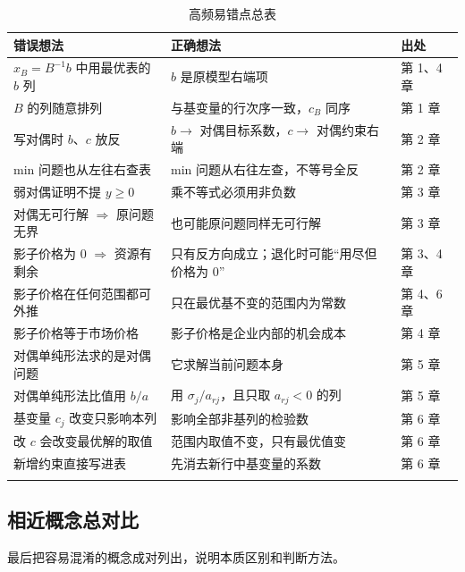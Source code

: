 {\small
\begin{xltabular}{\linewidth}{@{}>{\raggedright\arraybackslash}p{4.2cm}>{\raggedright\arraybackslash}X>{\raggedright\arraybackslash}p{1.6cm}@{}}
\toprule
{}错误想法 & 正确想法 & 出处\\\midrule\endhead
$x_B=B^{-1}b$ 中用最优表的 $b$ 列 & $b$ 是原模型右端项 & 第 1、4 章\\
$B$ 的列随意排列 & 与基变量的行次序一致，$c_B$ 同序 & 第 1 章\\
写对偶时 $b$、$c$ 放反 & $b\to$ 对偶目标系数，$c\to$ 对偶约束右端 & 第 2 章\\
min 问题也从左往右查表 & min 问题从右往左查，不等号全反 & 第 2 章\\
弱对偶证明不提 $y\ge0$ & 乘不等式必须用非负数 & 第 3 章\\
对偶无可行解 $\Rightarrow$ 原问题无界 & 也可能原问题同样无可行解 & 第 3 章\\
影子价格为 0 $\Rightarrow$ 资源有剩余 & 只有反方向成立；退化时可能“用尽但价格为 0” & 第 3、4 章\\
影子价格在任何范围都可外推 & 只在最优基不变的范围内为常数 & 第 4、6 章\\
影子价格等于市场价格 & 影子价格是企业内部的机会成本 & 第 4 章\\
对偶单纯形法求的是对偶问题 & 它求解当前问题本身 & 第 5 章\\
对偶单纯形法比值用 $b/a$ & 用 $\sigma_j/a_{rj}$，且只取 $a_{rj}<0$ 的列 & 第 5 章\\
基变量 $c_j$ 改变只影响本列 & 影响全部非基列的检验数 & 第 6 章\\
改 $c$ 会改变最优解的取值 & 范围内取值不变，只有最优值变 & 第 6 章\\
新增约束直接写进表 & 先消去新行中基变量的系数 & 第 6 章\\\bottomrule
\caption{高频易错点总表}\\
\end{xltabular}}


\subsection{相近概念总对比}

最后把容易混淆的概念成对列出，说明本质区别和判断方法。

